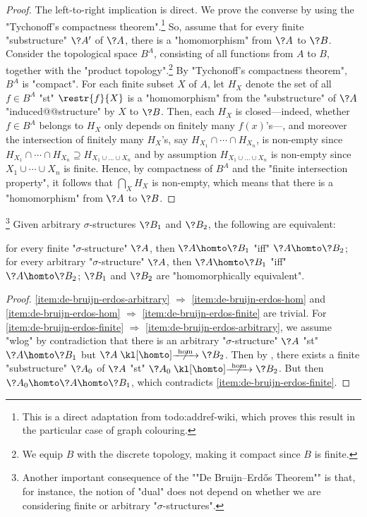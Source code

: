 \begin{proof}
	The left-to-right implication is direct.
	We prove the converse by using the "Tychonoff's compactness theorem".\footnote{This is a direct adaptation from todo:addref-wiki, which proves this result in the particular case of graph colouring.}
	So, assume that for every finite "substructure" $\?A'$ of $\?A$,
	there is a "homomorphism" from $\?A$ to $\?B$. 
	Consider the topological space $B^A$, consisting of all functions from $A$ to $B$,
	together with the "product topology".\footnote{We equip $B$ with the discrete topology,
	making it compact since $B$ is finite.} By "Tychonoff's compactness theorem",
	$B^A$ is "compact". For each finite subset $X$ of $A$, let
	$H_X$ denote the set of all $f \in B^A$ "st" $\restr{f}{X}$ is a "homomorphism"
	from the "substructure" of $\?A$ "induced@@structure" by $X$ to $\?B$.
	Then, each $H_X$ is closed---indeed, whether $f\in B^A$ belongs to $H_X$ only depends
	on finitely many $f(x)$'s---, and moreover the intersection of finitely many
	$H_X$'s, say $H_{X_1} \cap \cdots \cap H_{X_n}$, is non-empty since
	$H_{X_1} \cap \cdots \cap H_{X_n} \supseteq H_{X_1\cup \hdots \cup X_n}$
	and by assumption $H_{X_1\cup \hdots \cup X_n}$ is non-empty since $X_1 \cup \cdots \cup X_n$ is finite. Hence, by compactness of $B^A$ and the "finite intersection property", it follows
	that $\bigcap_X H_X$ is non-empty, which means that there is a "homomorphism" from $\?A$ to $\?B$.
\end{proof}

\begin{corollary}
	\!\footnote{Another important consequence of the ""De Bruijn–Erdős Theorem"" is that,
	for instance, the notion of "dual" does not depend on whether we are considering finite or
	arbitrary "$\sigma$-structures".}
	\AP\label{coro:de-bruijn-erdos}
	Given arbitrary $\sigma$-structures $\?B_1$ and $\?B_2$, the following are equivalent:
	\begin{enumerate}
		\itemAP\label{item:de-bruijn-erdos-finite} for every finite "$\sigma$-structure" $\?A$, then $\?A \homto \?B_1$
		"iff" $\?A \homto \?B_2$;
		\itemAP\label{item:de-bruijn-erdos-arbitrary} for every arbitrary "$\sigma$-structure" $\?A$, then $\?A \homto \?B_1$
			"iff" $\?A \homto \?B_2$;
		\itemAP\label{item:de-bruijn-erdos-hom} $\?B_1$ and $\?B_2$ are "homomorphically equivalent".
	\end{enumerate}
\end{corollary}
\begin{proof}
	\eqref{item:de-bruijn-erdos-arbitrary} $\Rightarrow$ \eqref{item:de-bruijn-erdos-hom}
	and \eqref{item:de-bruijn-erdos-hom} $\Rightarrow$ \eqref{item:de-bruijn-erdos-finite}
	are trivial.
	For \eqref{item:de-bruijn-erdos-finite} $\Rightarrow$ \eqref{item:de-bruijn-erdos-arbitrary},
	we assume "wlog" by contradiction that there is an arbitrary "$\sigma$-structure" $\?A$ "st" $\?A \homto \?B_1$ but $\?A \nothomto \?B_2$. Then by ,
	there exists a finite "substructure" $\?A_0$ of $\?A$ "st" $\?A_0 \nothomto \?B_2$.
	But then $\?A_0 \homto \?A \homto \?B_1$, which contradicts \eqref{item:de-bruijn-erdos-finite}.
\end{proof}

